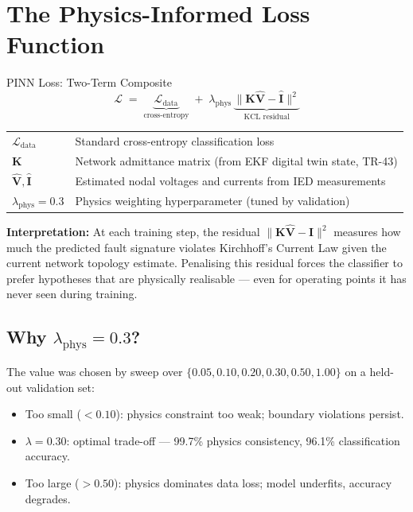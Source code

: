 \documentclass[12pt,a4paper]{article}
\begin{document}
\section{The Physics-Informed Loss Function}

\begin{formulabox}{PINN Loss: Two-Term Composite}
\[
  \mathcal{L} \;=\; \underbrace{\mathcal{L}_\mathrm{data}}_{\text{cross-entropy}}
  \;+\; \lambda_\mathrm{phys}\,
  \underbrace{\bigl\|\mathbf{K}\hat{\mathbf{V}} - \hat{\mathbf{I}}\bigr\|^2}_{\text{KCL residual}}
\]

\medskip
\begin{tabular}{@{}ll@{}}
$\mathcal{L}_\mathrm{data}$         & Standard cross-entropy classification loss \\
$\mathbf{K}$                        & Network admittance matrix (from EKF digital twin state, TR-43) \\
$\hat{\mathbf{V}}, \hat{\mathbf{I}}$ & Estimated nodal voltages and currents from IED measurements \\
$\lambda_\mathrm{phys} = 0.3$       & Physics weighting hyperparameter (tuned by validation) \\
\end{tabular}

\medskip
\textbf{Interpretation:} At each training step, the residual $\|\mathbf{K}\hat{\mathbf{V}} - \hat{\mathbf{I}}\|^2$ measures how much the predicted fault signature violates Kirchhoff's Current Law given the current network topology estimate. Penalising this residual forces the classifier to prefer hypotheses that are physically realisable — even for operating points it has never seen during training.
\end{formulabox}

\subsection{Why $\lambda_\mathrm{phys} = 0.3$?}

The value was chosen by sweep over $\{0.05, 0.10, 0.20, 0.30, 0.50, 1.00\}$ on a held-out validation set:
\begin{itemize}[nosep]
  \item Too small ($< 0.10$): physics constraint too weak; boundary violations persist.
  \item $\lambda = 0.30$: optimal trade-off — 99.7\% physics consistency, 96.1\% classification accuracy.
  \item Too large ($> 0.50$): physics dominates data loss; model underfits, accuracy degrades.
\end{itemize}
\end{document}
